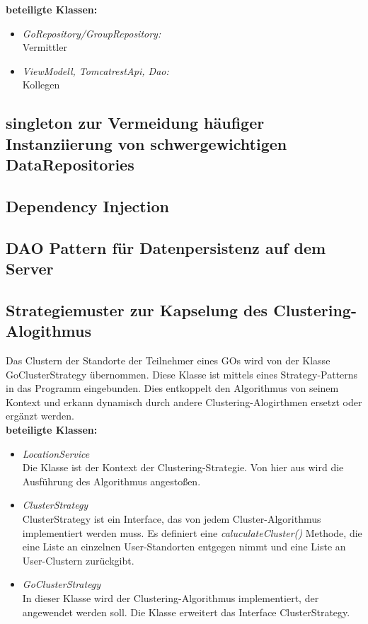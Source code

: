 \documentclass[parskip=full]{scrartcl}
\begin{document}
\textbf{beteiligte Klassen:}\\
\begin{itemize}
	\item \textit{GoRepository/GroupRepository:}\\
	 Vermittler
	\item \textit{ViewModell, TomcatrestApi, Dao:}\\ Kollegen
\end{itemize}

\subsection{singleton zur Vermeidung häufiger Instanziierung von schwergewichtigen DataRepositories}

\subsection{Dependency Injection}

\subsection{DAO Pattern für Datenpersistenz auf dem Server}

\subsection{Strategiemuster zur Kapselung des Clustering-Alogithmus}
Das Clustern der Standorte der Teilnehmer eines GOs wird von der Klasse GoClusterStrategy übernommen. Diese Klasse ist mittels eines Strategy-Patterns in das Programm eingebunden. Dies entkoppelt den Algorithmus von seinem Kontext und erkann dynamisch durch andere Clustering-Alogirthmen ersetzt oder ergänzt werden. \\

\textbf{beteiligte Klassen:}
\begin{itemize}
	\item \textit{LocationService} \\
	Die Klasse ist der Kontext der Clustering-Strategie. Von hier aus wird die Ausführung des Algorithmus angestoßen.
	\item \textit{ClusterStrategy} \\
	ClusterStrategy ist ein Interface, das von jedem Cluster-Algorithmus implementiert werden muss. Es definiert eine \textit{caluculateCluster()} Methode, die eine Liste an einzelnen User-Standorten entgegen nimmt und eine Liste an User-Clustern zurückgibt.
	\item \textit{GoClusterStrategy} \\
	In dieser Klasse wird der Clustering-Algorithmus implementiert, der angewendet werden soll. Die Klasse erweitert das Interface ClusterStrategy.
\end{itemize}
\end{document}
